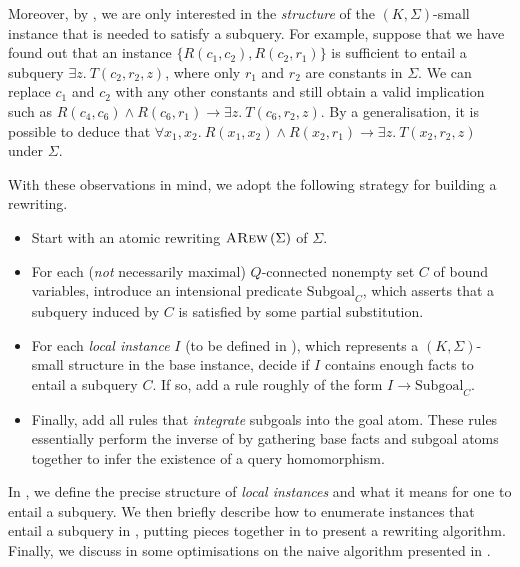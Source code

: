 \documentclass[12pt]{report}
\theoremstyle{plain}
\theoremstyle{definition}
\newcommand{\ARew}[1]{\ensuremath{\normalfont{\textsc{ARew}} \left( #1 \right)}}
\begin{document}
Moreover, by , we are only interested in the \emph{structure} of the $(K, \Sigma)$-small instance that is needed to satisfy a subquery. For example, suppose that we have found out that an instance $\{R(c_1, c_2), R(c_2, r_1)\}$ is sufficient to entail a subquery $\exists z.\ T(c_2, r_2, z)$, where only $r_1$ and $r_2$ are constants in $\Sigma$. We can replace $c_1$ and $c_2$ with any other constants and still obtain a valid implication such as $R(c_4, c_6) \wedge R(c_6, r_1) \rightarrow \exists z.\ T(c_6, r_2, z)$. By a generalisation, it is possible to deduce that $\forall x_1, x_2.\ R(x_1, x_2) \wedge R(x_2, r_1) \rightarrow \exists z.\ T(x_2, r_2, z)$ under $\Sigma$.

With these observations in mind, we adopt the following strategy for building a rewriting.

\begin{itemize}
  \item Start with an atomic rewriting $\ARew{\Sigma}$ of $\Sigma$.
  \item For each (\emph{not} necessarily maximal) $Q$-connected nonempty set $C$ of bound variables, introduce an intensional predicate $\mathrm{Subgoal}_C$, which asserts that a subquery induced by $C$ is satisfied by some partial substitution.
  \item For each \emph{local instance} $I$ (to be defined in ), which represents a $(K, \Sigma)$-small structure in the base instance, decide if $I$ contains enough facts to entail a subquery $C$. If so, add a rule roughly of the form $I \rightarrow \mathrm{Subgoal}_C$.
  \item Finally, add all rules that \emph{integrate} subgoals into the goal atom. These rules essentially perform the inverse of  by gathering base facts and subgoal atoms together to infer the existence of a query homomorphism.
\end{itemize}

In , we define the precise structure of \emph{local instances} and what it means for one to entail a subquery. We then briefly describe how to enumerate instances that entail a subquery in , putting pieces together in  to present a rewriting algorithm. Finally, we discuss in  some optimisations on the naive algorithm presented in .
\end{document}
